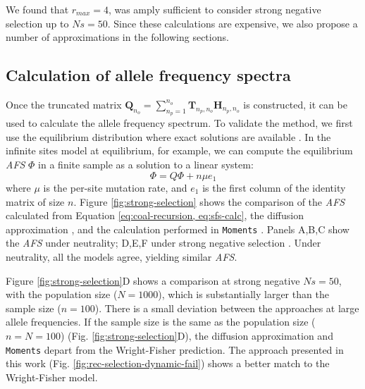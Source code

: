 \documentclass[review]{elsarticle}
\newcommand{\sgcomment}[1]{{\color{red}{SG: #1}}}
\begin{document}
We found that $r_{max}=4$, was amply 
sufficient to consider strong negative selection up to $Ns=50$. Since these calculations are
expensive, we also propose a number of approximations in the following sections. \sgcomment{Check: do we?}

\subsection{Calculation of allele frequency spectra}
\label{subsec:afs}

Once the truncated matrix
$\mathbf{Q}_{n_o} = \sum_{n_p=1}^{n_{o}} \mathbf{T}_{n_p,n_o} \mathbf{H}_{n_p,n_o}$ is constructed, it can
be used to calculate the allele frequency spectrum. 
To validate the method, we first use the equilibrium distribution where exact solutions are available \cite{Krukov}.
In the infinite sites model at equilibrium, for example, we can compute the equilibrium 
\textit{AFS} $\Phi$ in a finite sample as a solution to a linear system:
\begin{equation}
  \label{eq:sfs-calc}
  \Phi = Q \Phi  + n \mu e_1
\end{equation}
where $\mu$ is the per-site mutation rate, and $e_1$ is the first column of the identity matrix of
size $n$. Figure \ref{fig:strong-selection} shows the comparison of the \textit{AFS} calculated from
Equation \eqref{eq:coal-recursion, eq:sfs-calc}, the diffusion approximation \cite[eq.
9.23]{Ewens2004}, and the calculation performed in \texttt{Moments} \citep{JouganousEtAl2017}.
Panels A,B,C show the \textit{AFS} under neutrality; D,E,F under strong negative selection \sgcomment{This would be in the caption, no?}. Under
neutrality, all the models agree, yielding similar \textit{AFS}. \sgcomment{That is not my interpretation...}

Figure \ref{fig:strong-selection}D shows a comparison at strong negative $Ns=50$, with the
population size ($N=1000$), which is substantially larger than the sample size ($n=100$). There is a
small deviation between the approaches at large allele frequencies. If the sample size is the same
as the population size ($n=N=100$) (Fig. \ref{fig:strong-selection}D), the diffusion approximation
and \texttt{Moments} depart from the Wright-Fisher prediction. The approach presented in this work
(Fig. \ref{fig:rec-selection-dynamic-fail}) shows a better match to the Wright-Fisher model.
\end{document}
